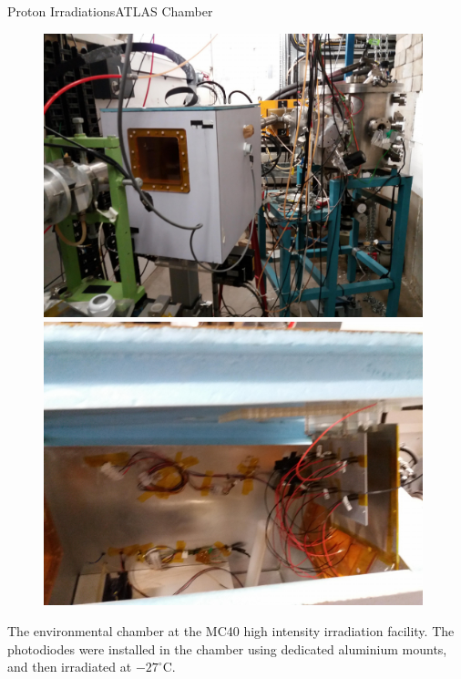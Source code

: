 \documentclass{beamer}
\begin{document}
    \begin{frame}{Proton Irradiations}{ATLAS Chamber}
        \begin{figure}
            \begin{minipage}[b]{0.5\linewidth}
            \centering
            \includegraphics[width = 0.98\textwidth]{ATLAS_chamber.jpg}
        \end{minipage}%
        \begin{minipage}[b]{0.5\linewidth}
            \centering
            \includegraphics[width = 0.98\textwidth]{Isolation_box.jpg}
        \end{minipage}
        \end{figure}
        The environmental chamber at the MC40 high intensity irradiation facility. The photodiodes were installed in the chamber using dedicated aluminium mounts, and then irradiated at $-27^{\circ}$C.
    \end{frame}
\end{document}
